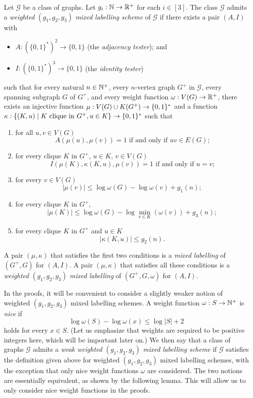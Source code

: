 \documentclass{patmorin}
\renewcommand{\le}{\leqslant}
\renewcommand{\leq}{\leqslant}
\newcommand{\defin}[1]{\emph{\textcolor{brightmaroon}{#1}}}
\DeclarePairedDelimiter{\set}{\{}{\}}
\newcommand{\calG}{\mathcal{G}}
\begin{document}
Let $\calG$ be a class of graphs.
Let $g_i:\mathbb{N}\to\mathbb{R}^+$ for each $i\in[3]$.
The class  $\calG$ admits a \defin{weighted $(g_1,g_2,g_3)$ mixed labelling scheme} of $\calG$ if there exists a pair $(A,I)$ with
\begin{itemize}[nosep,nolistsep]
     \item $A:(\{0,1\}^*)^2\to\{0,1\}$ (the \defin{adjacency tester}); and
     \item $I:(\{0,1\}^*)^3\to\{0,1\}$ (the \defin{identity tester})
\end{itemize}
such that
for every natural $n\in\mathbb{N}^+$,
every $n$-vertex graph $G^+$ in $\calG$,
every spanning subgraph $G$ of $G^+$, and
every weight function $\omega:V(G)\to \mathbb{R}^+$,
there exists an injective function $\mu: V(G)\cup K(G^+) \to \set{0,1}^*$ and a function $\kappa:\{(K, u)\mid \textrm{$K$ clique in $G^+$}, u\in K\}\to \set{0,1}^*$
such that
\begin{enumerate}[nosep,nolistsep,label=(\roman*)]
    \item for all $u,v\in V(G)$
    \[
    \textrm{$A(\mu(u),\mu(v))=1$ if and only if $uv\in E(G)$;}
    \]
    \item for every clique $K$ in $G^+$, $u\in K$, $v\in V(G)$
    \[
    \textrm{$I(\mu(K),\kappa(K, u),\mu(v))=1$ if and only if $u=v$;}
    \]
    \item for every $v\in V(G)$
    \[
    |\mu(v)| \leq \log \omega(G) - \log\omega(v) + g_1(n);
    \]
    \item for every clique $K$ in $G^+$,
    \[
    |\mu(K)|\le \log \omega(G) - \log\min_{v\in K}(\omega(v)) + g_3(n);
    \]
    \item  for every clique $K$ in $G^+$ and $u\in K$
    \[
    |\kappa(K, u)| \leq g_2(n).
    \]
\end{enumerate}
A pair $(\mu,\kappa)$ that satisfies the first two conditions is a \defin{mixed labelling} of $(G^+,G)$ for $(A,I)$.  A pair $(\mu,\kappa)$ that satisfies all these conditions is a \defin{weighted $(g_1,g_2,g_3)$ mixed labelling} of $(G^+,G,\omega)$ for $(A,I)$.

In the proofs, it will be convenient to consider a slightly weaker notion of weighted $(g_1,g_2,g_3)$ mixed labelling schemes.
A weight function $\omega:S\to \mathbb{N}^+$ is \defin{nice} if
\[
  \log \omega(S) - \log \omega(x) \leq \log |S| + 2
\]
holds for every $x\in S$.
(Let us emphasize that weights are required to be positive integers here, which will be important later on.)
We then say that a class of graphs $\calG$ admits a \defin{weak weighted $(g_1,g_2,g_3)$ mixed labelling scheme} if $\calG$ satisfies the definition given above for weighted $(g_1,g_2,g_3)$ mixed labelling schemes, with the exception that only nice weight functions $\omega$ are considered.
The two notions are essentially equivalent, as shown by the following lemma. This will allow us to only consider nice weight functions in the proofs.
\end{document}
